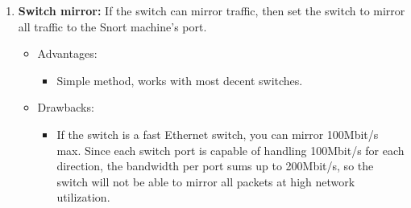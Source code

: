 \documentclass{article}
\begin{document}
\begin{enumerate}
\item  {\bf Switch mirror:} If the switch can mirror traffic, then set the switch to
    mirror all traffic to the Snort machine's port.
   \begin{itemize}
   	\item Advantages:
	      \begin{itemize}
              \item Simple method, works with most decent switches.
	      \end{itemize}
	 \item Drawbacks:
	      \begin{itemize}
              \item If the switch is a fast Ethernet switch, you can mirror 100Mbit/s
	      max. Since each switch port is capable of handling 100Mbit/s for each
	      direction, the bandwidth per port sums up to 200Mbit/s, so the switch
	      will not be able to mirror all packets at high network utilization.


\end{itemize}
\end{itemize}
\end{enumerate}
\end{document}
